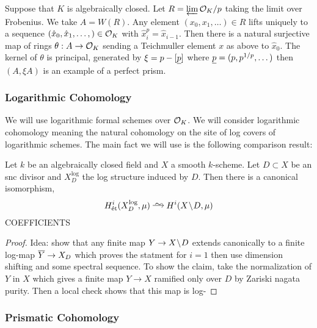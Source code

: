 \documentclass[12pt]{article}
\begin{document}
\begin{example}
Suppose that $K$ is algebraically closed. Let $R = \operatorname*{\varprojlim} \mathcal{O}_K / p$ taking the limit over Frobenius. We take $A = W(R)$. Any element $(x_0, x_1, \dots) \in R$ lifts uniquely to a sequence $(\hat{x}_0, \hat{x}_1, \dots,) \in \mathcal{O}_K$ with $\hat{x}_i^p = \hat{x}_{i-1}$. Then there is a natural surjective map of rings $\theta : A \to \mathcal{O}_K$ sending a Teichmuller element $x$ as above to $\hat{x}_0$. The kernel of $\theta$ is principal, generated by $\xi = p - [\underline{p}]$ where $\underline{p} = (p, p^{1/p}, \dots)$ then $(A, \xi A)$ is an example of a perfect prism. 
\end{example}

\subsubsection{Logarithmic Cohomology}

We will use logarithmic formal schemes over $\mathcal{O}_K$. We will consider logarithmic \etale cohomology meaning the natural cohomology on the site of log \etale covers of logarithmic schemes. The main fact we will use is the following comparison result:

\begin{theorem}
Let $k$ be an algebraically closed field and $X$ a smooth $k$-scheme. Let $D \subset X$ be an snc divisor and $X_D^{\log}$ the log structure induced by $D$. Then there is a canonical isomorphism,
\[ H^i_{\et}(X_D^{\log}, \mu) \iso H^i(X \sm D, \mu) \]
{\color{red} COEFFICIENTS}
\end{theorem}

\begin{proof}
Idea: show that any finite \etale map $Y \to X \! \setminus \! D$ extends canonically to a finite log-\etale map $\overline{Y} \to X_D$ which proves the statment for $i = 1$ then use dimension shifting and some spectral sequence. To show the claim, take the normalization of $Y$ in $X$ which gives a finite map $Y \to X$ ramified only over $D$ by Zariski nagata purity. Then a local check shows that this map is log- 
\end{proof}

\subsubsection{Prismatic Cohomology}
\end{document}
